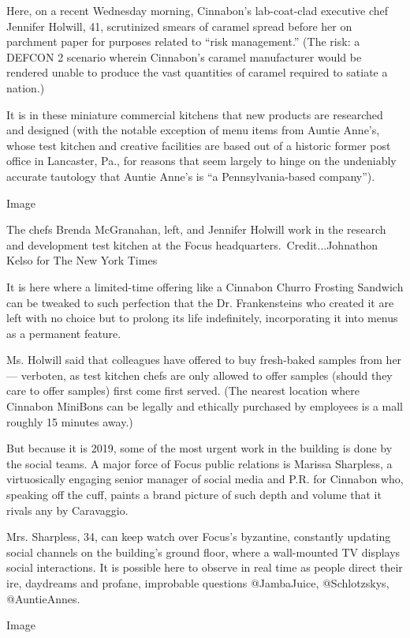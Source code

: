 Here, on a recent Wednesday morning, Cinnabon's lab-coat-clad executive
chef Jennifer Holwill, 41, scrutinized smears of caramel spread before
her on parchment paper for purposes related to ``risk management.'' (The
risk: a DEFCON 2 scenario wherein Cinnabon's caramel manufacturer would
be rendered unable to produce the vast quantities of caramel required to
satiate a nation.)

It is in these miniature commercial kitchens that new products are
researched and designed (with the notable exception of menu items from
Auntie Anne's, whose test kitchen and creative facilities are based out
of a historic former post office in Lancaster, Pa., for reasons that
seem largely to hinge on the undeniably accurate tautology that Auntie
Anne's is ``a Pennsylvania-based company'').

Image

The chefs Brenda McGranahan, left, and Jennifer Holwill work in the
research and development test kitchen at the Focus
headquarters.~Credit...Johnathon Kelso for The New York Times

It is here where a limited-time offering like a Cinnabon Churro Frosting
Sandwich can be tweaked to such perfection that the Dr. Frankensteins
who created it are left with no choice but to prolong its life
indefinitely, incorporating it into menus as a permanent feature.

Ms. Holwill said that colleagues have offered to buy fresh-baked samples
from her --- verboten, as test kitchen chefs are only allowed to offer
samples (should they care to offer samples) first come first served.
(The nearest location where Cinnabon MiniBons can be legally and
ethically purchased by employees is a mall roughly 15 minutes away.)

But because it is 2019, some of the most urgent work in the building is
done by the social teams. A major force of Focus public relations is
Marissa Sharpless, a virtuosically engaging senior manager of social
media and P.R. for Cinnabon who, speaking off the cuff, paints a brand
picture of such depth and volume that it rivals any by Caravaggio.

Mrs. Sharpless, 34, can keep watch over Focus's byzantine, constantly
updating social channels on the building's ground floor, where a
wall-mounted TV displays social interactions. It is possible here to
observe in real time as people direct their ire, daydreams and profane,
improbable questions @JambaJuice, @Schlotzskys, @AuntieAnnes.

Image

